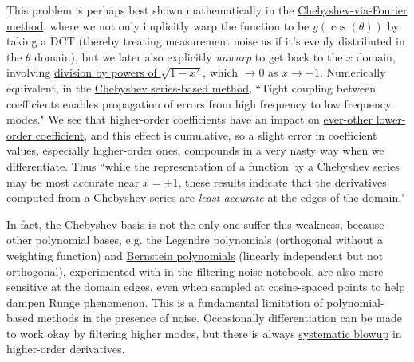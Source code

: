 \documentclass[10pt]{article}
\begin{document}
This problem is perhaps best shown mathematically in the \hyperref[algo]{Chebyshev-via-Fourier method}, where we not only implicitly warp the function to be $y(\cos(\theta))$ by taking a DCT (thereby treating measurement noise as if it's evenly distributed in the $\theta$ domain), but we later also explicitly \textit{unwarp} to get back to the $x$ domain, involving \hyperref[pyramid]{division by powers of $\sqrt{1-x^2}$}\cite{brown, trefethen8}, which $ \rightarrow 0$ as $x \rightarrow \pm 1$. Numerically equivalent, in the \hyperref[seriesrule]{Chebyshev series-based method}, ``Tight coupling between coefficients enables propagation of errors from high frequency to low frequency modes."\cite{brown} We see that higher-order coefficients have an impact on \href{https://scicomp.stackexchange.com/q/44939/48402}{ever-other lower-order coefficient}\cite{dcoefs}, and this effect is cumulative, so a slight error in coefficient values, especially higher-order ones, compounds in a very nasty way when we differentiate. Thus ``while the representation of a function by a Chebyshev series may be most accurate near $x = \pm 1$, these results indicate that the derivatives computed from a Chebyshev series are \textit{least accurate} at the edges of the domain."\cite{brown}

In fact, the Chebyshev basis is not the only one suffer this weakness, because other polynomial bases, e.g. the Legendre polynomials (orthogonal without a weighting function) and \href{https://en.wikipedia.org/wiki/Bernstein_polynomial}{Bernstein polynomials} (linearly independent but not orthogonal), experimented with in the \href{https://github.com/pavelkomarov/spectral-derivatives/blob/main/notebooks/filtering_noise.ipynb}{filtering noise notebook}, are also more sensitive at the domain edges, even when sampled at cosine-spaced points to help dampen Runge phenomenon. This is a fundamental limitation of polynomial-based methods in the presence of noise. Occasionally differentiation can be made to work okay by filtering higher modes, but there is always \href{https://github.com/pavelkomarov/spectral-derivatives/blob/main/notebooks/filtering_noise.ipynb}{systematic blowup} in higher-order derivatives.

\printendnotes
\end{document}
